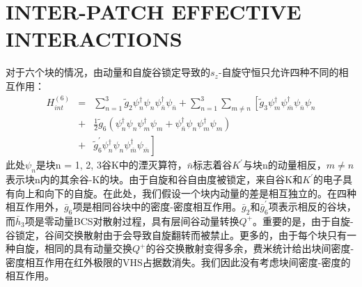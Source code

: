 \documentclass[reprint, aps, prb, showkeys]{revtex4-2}
\begin{document}
\section{INTER-PATCH EFFECTIVE INTERACTIONS}
对于六个块的情况，由动量和自旋谷锁定导致的$s_z$-自旋守恒只允许四种不同的相互作用：
\begin{eqnarray}
    H_{int}^{(6)} &=& \sum_{n=1}^3 \tilde{g}_2 \psi_n^{\dagger} \psi_n \psi_{\bar{n}}^{\dagger} \psi_{\bar{n}} + \sum_{n=1}^3 \sum_{m \neq n} \left[ \tilde{g}_3 \psi_m^{\dagger} \psi_{\bar{m}}^{\dagger} \psi_{\bar{n}} \psi_n \right. \nonumber \\
    &+& \frac{1}{2} \tilde{g}_6 \left( \psi_n^{\dagger} \psi_n \psi_{m}^{\dagger} \psi_{m} + \psi_{\bar{n}}^{\dagger} \psi_n \psi_{m}^{\dagger} \psi_{m} \right) \nonumber \\
    &+& \left. \tilde{g}_6^{'} \psi_n^{\dagger} \psi_n \psi_{\bar{m}}^{\dagger} \psi_{\bar{m}} \right]
\end{eqnarray}
此处$\psi_n$是块n = 1, 2, 3谷K中的湮灭算符，$\bar{n}$标志着谷$K^{'}$与块n的动量相反，$m \neq n$表示块n内的其余谷-K的块。由于自旋和谷自由度被锁定，来自谷K和$K^{'}$的电子具有向上和向下的自旋。在此处，我们假设一个块内动量的差是相互独立的。在四种相互作用外，$\bar{g}_6$项是相同谷块中的密度-密度相互作用。$\bar{g}_2$和$\bar{g}_6^{'}$项表示相反的谷块，而$\bar{h}_3$项是零动量BCS对散射过程，具有层间谷动量转换$Q^{+}$。重要的是，由于自旋-谷锁定，谷间交换散射由于会导致自旋翻转而被禁止。更多的，由于每个块只有一种自旋，相同的具有动量交换$Q^{+}$的谷交换散射变得多余，费米统计给出块间密度-密度相互作用在红外极限的VHS占据数消失。我们因此没有考虑块间密度-密度的相互作用。
\end{document}
